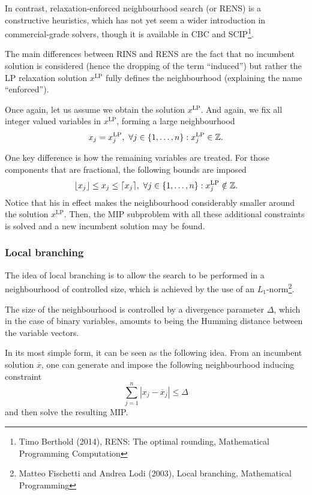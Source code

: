 In contrast, relaxation-enforced neighbourhood search (or RENS) is a constructive heuristics, which has not yet seem a wider introduction in commercial-grade solvers, though it is available in   CBC and SCIP\footnote{Timo Berthold (2014), RENS: The optimal rounding, Mathematical Programming Computation}.
 
The main differences between RINS and RENS are the fact that no incumbent solution is considered (hence the dropping of the term ``induced'') but rather the LP relaxation solution $x^{\text{LP}}$ fully defines the neighbourhood (explaining the name ``enforced'').
 
Once again, let us assume we obtain the solution $x^{\text{LP}}$. And again, we fix all integer valued variables in $x^{\text{LP}}$, forming a large neighbourhood
%
\begin{equation*}
	x_j = x_j^{\text{LP}}, \ \forall j \in \left\{ 1,\dots,n \right \} : x_j^{\text{LP}} \in \mathbb{Z}.
\end{equation*}
%

One key difference is how the remaining variables are treated. For those components that are fractional, the following bounds are imposed
%
\begin{equation*}
	\lfloor x_j \rfloor \leq x_j \leq \lceil x_j \rceil, \ \forall j \in \left\{ 1,\dots,n \right \} : x_j^{\text{LP}} \notin \mathbb{Z}.
\end{equation*}
%
Notice that his in effect makes the neighbourhood considerably smaller around the solution $x^{\text{LP}}$. Then, the MIP subproblem with all these additional constraints is solved and a new incumbent solution may be found. 

 
\subsubsection{Local branching}

The idea of local branching is to allow the search to be performed in a neighbourhood of controlled size, which is achieved by the use of an $L_1$-norm\footnote{Matteo Fischetti and Andrea Lodi (2003), Local branching, Mathematical Programming}.  

The size of the neighbourhood is controlled by a divergence parameter $\Delta$, which in the case of binary variables, amounts to being the Humming distance between the variable vectors. 

In its most simple form, it can be seen as the following idea. From an incumbent solution $\overline{x}$, one can generate and impose the following neighbourhood inducing constraint
%
\begin{equation*}
	\sum_{j=1}^n | x_j - \overline{x}_j | \leq \Delta
\end{equation*}
%
and then solve the resulting MIP. 

